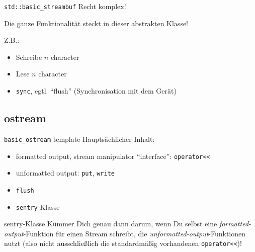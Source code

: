 \begin{frame}{\texttt{std::basic\_streambuf}}
	Recht komplex!
	
	\vspace{2em}
	
	Die ganze Funktionalität steckt in dieser abstrakten Klasse!
	
	Z.B.:
	\begin{itemize}
		\item Schreibe $n$ character
		\item Lese $n$ character
		\item \texttt{sync}, egtl. \enquote{flush} (Synchronisation mit dem Gerät)
	\end{itemize}
\end{frame}


\subsection{ostream}

\begin{frame}{\texttt{basic\_ostream} template}
	Hauptsächlicher Inhalt:
	\begin{itemize}
		\item formatted output, stream manipulator \enquote{interface}: \texttt{operator<<}
		\item unformatted output: \texttt{put}, \texttt{write}
		\item \texttt{flush}
		\item \texttt{sentry}-Klasse
	\end{itemize}
	
	\pause
	\vspace{2em}
	
	\begin{block}{sentry-Klasse}
		Kümmer Dich genau dann darum, wenn Du selbst eine \emph{formatted-output}-Funktion für einen Stream schreibt, die \emph{unformatted-output}-Funktionen nutzt (also nicht ausschließlich die standardmäßig vorhandenen \texttt{operator<<})!
	\end{block}
\end{frame}

